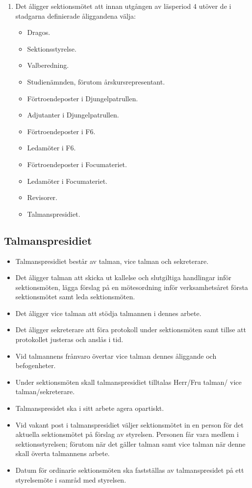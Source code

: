 \documentclass[11pt,a4paper]{article}
\begin{document}
\begin{enumerate}[\thesubsection .1]
  \item Det åligger sektionsmötet att innan utgången av  läsperiod 4
    utöver de i stadgarna definierade åliggandena välja:
    \begin{itemize}
      \item Dragos.
      \item Sektionsstyrelse.
      \item Valberedning.
      \item Studienämnden, förutom årskursrepresentant.
      \item Förtroendeposter i Djungelpatrullen.
      \item Adjutanter i Djungelpatrullen.
      \item Förtroendeposter i F6.
      \item Ledamöter i F6.
      \item Förtroendeposter i Focumateriet.
      \item Ledamöter i Focumateriet. 
       \item Revisorer.
       \item Talmanspresidiet.
    \end{itemize}

\end{enumerate}

\subsection{Talmanspresidiet}

\begin{itemize}
    \item Talmanspresidiet består av talman, vice talman och sekreterare. 
    \item Det åligger talman att skicka ut kallelse och slutgiltiga handlingar inför sektionsmöten, lägga förslag på en mötesordning inför verksamhetsåret första sektionsmötet samt leda sektionsmöten. 
    \item Det åligger vice talman att stödja talmannen i dennes arbete.
    \item Det åligger sekreterare att föra protokoll under sektionsmöten samt tillse att protokollet justeras och anslås i tid. 
    \item Vid talmannens frånvaro övertar vice talman dennes åliggande och befogenheter. 
    \item Under sektionsmöten skall talmanspresidiet tilltalas Herr/Fru talman/ vice talman/sekreterare. 
    \item Talmanspresidet ska i sitt arbete agera opartiskt. 
    \item Vid vakant post i talmanspresidiet väljer sektionsmötet in en person för det aktuella sektionsmötet på förslag av styrelsen. Personen får vara medlem i sektionsstyrelsen; förutom när det gäller talman samt vice talman när denne skall överta talmannens arbete. 
    \item Datum för ordinarie sektionsmöten ska fastställas av talmanspresidet på ett styrelsemöte i samråd med styrelsen.
\end{itemize}
\end{document}
